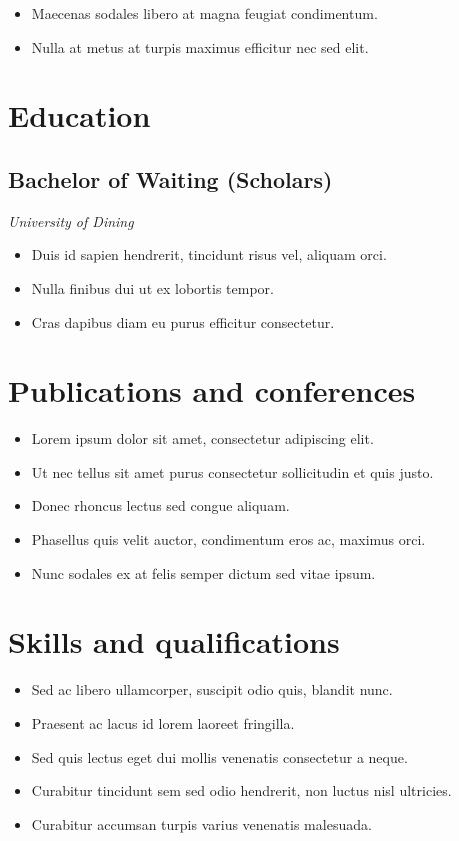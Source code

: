 \documentclass[a4paper,11pt]{article}
\begin{document}
\begin{itemize}
\item Maecenas sodales libero at magna feugiat condimentum.
\item Nulla at metus at turpis maximus efficitur nec sed elit.
\end{itemize}

\section*{Education}
\label{sec:orgd0e5d80}
\subsection*{Bachelor of Waiting (Scholars)  \hfill{}  }
\label{sec:org28d4529}
\emph{University of Dining}

\begin{itemize}
\item Duis id sapien hendrerit, tincidunt risus vel, aliquam orci.
\item Nulla finibus dui ut ex lobortis tempor.
\item Cras dapibus diam eu purus efficitur consectetur.
\end{itemize}

\section*{Publications and conferences}
\label{sec:orgb9338e0}
\begin{itemize}
\item Lorem ipsum dolor sit amet, consectetur adipiscing elit.
\item Ut nec tellus sit amet purus consectetur sollicitudin et quis justo.
\item Donec rhoncus lectus sed congue aliquam.
\item Phasellus quis velit auctor, condimentum eros ac, maximus orci.
\item Nunc sodales ex at felis semper dictum sed vitae ipsum.
\end{itemize}

\subsection*{ \clearpage }
\label{sec:orgc44bd3f}

\section*{Skills and qualifications}
\label{sec:org97d0534}
\begin{itemize}
\item Sed ac libero ullamcorper, suscipit odio quis, blandit nunc.
\item Praesent ac lacus id lorem laoreet fringilla.
\item Sed quis lectus eget dui mollis venenatis consectetur a neque.
\item Curabitur tincidunt sem sed odio hendrerit, non luctus nisl ultricies.
\item Curabitur accumsan turpis varius venenatis malesuada.
\end{itemize}
\end{document}
